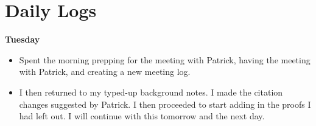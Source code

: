 \documentclass[12pt,a4paper]{article}
\begin{document}
\section{Daily Logs}

\textbf{Tuesday} 

\begin{itemize}
    \item Spent the morning prepping for the meeting with Patrick, having the meeting with Patrick, and creating a new meeting log.
    \item I then returned to my typed-up background notes. I made the citation changes suggested by Patrick. I then proceeded to start adding in the proofs I had left out. I will continue with this tomorrow and the next day. 
\end{itemize}
\end{document}
